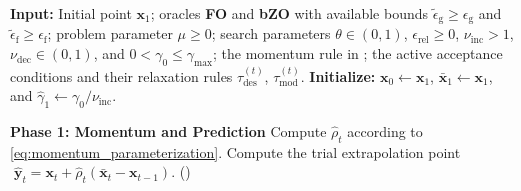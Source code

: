 \documentclass{article}
\begin{document}
\begin{algorithm}[t]
\small
\caption{\texttt{SAAS}: Safeguarded Accelerated Adaptive Search}
\label{algo}
\begin{algorithmic}[1]
    \State \textbf{Input:} Initial point \(\bm{x}_1\); oracles
\textbf{\textbf{FO}} and \textbf{\textbf{bZO}} with available bounds
\(\widetilde\epsilon_{\mathrm{g}}\ge\epsilon_{\mathrm{g}}\) and
\(\widetilde\epsilon_{\mathrm{f}}\ge\epsilon_{\mathrm{f}}\); problem parameter \(\mu\ge0\);
search parameters \(\theta\in(0,1)\), \(\epsilon_{\mathrm{rel}}\ge0\),
\(\nu_{\mathrm{inc}}>1\), \(\nu_{\mathrm{dec}}\in(0,1)\), and
\(0<\gamma_0\le\gamma_{\max}\); the momentum rule in
; the active acceptance conditions and their relaxation rules \(\tau_{\mathrm{des}}^{(t)}\),
        \(\tau_{\mathrm{mod}}^{(t)}\).
    \State \textbf{Initialize:}
\(\bm{x}_0\gets \bm{x}_1\), \(\bar {\bm{x}}_1\gets \bm{x}_1\), and
\(\hat\gamma_1\gets\gamma_0/\nu_{\mathrm{inc}}\).

    \vspace{0.1cm}
        \vspace{0.05cm}
        \State \textbf{Phase 1: Momentum and Prediction}
        \State Compute \(\hat\rho_t\) according to
        \eqref{eq:momentum_parameterization}.
        \State {}\label{update_y_t}Compute the trial extrapolation point
        \(\;\hat {\bm{y}}_t=\bm{x}_t+\hat\rho_t(\bar {\bm{x}}_t-\bm{x}_{t-1})\).
        \hfill \textup{(\theequation)}


\end{algorithmic}
\end{algorithm}
\end{document}
